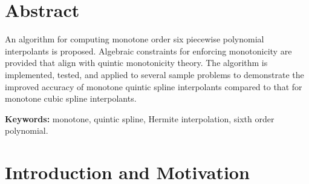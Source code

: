 \documentclass{scspaperproc}
\theoremstyle{scsthe}
\begin{document}
\maketitle



\section*{Abstract}

An algorithm for computing monotone order six piecewise polynomial
interpolants is proposed. Algebraic constraints for enforcing
monotonicity are provided that align with quintic monotonicity
theory. The algorithm is implemented, tested, and applied to several
sample problems to demonstrate the improved accuracy of monotone
quintic spline interpolants compared to that for monotone cubic spline
interpolants.

\textbf{Keywords:} monotone, quintic spline, Hermite interpolation, sixth order polynomial.


\section{Introduction and Motivation}
\label{sec:introduction}


\end{document}
